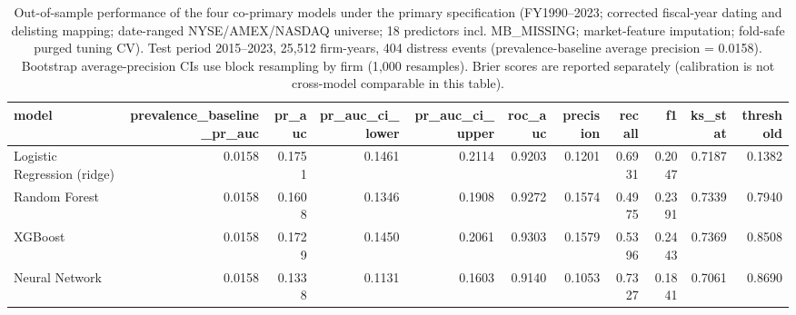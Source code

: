 \begin{table}[htbp]
\centering
\caption{Out-of-sample performance of the four co-primary models under the primary specification (FY1990--2023; corrected fiscal-year dating and delisting mapping; date-ranged NYSE/AMEX/NASDAQ universe; 18 predictors incl. MB\_MISSING; market-feature imputation; fold-safe purged tuning CV). Test period 2015--2023, 25,512 firm-years, 404 distress events (prevalence-baseline average precision = 0.0158). Bootstrap average-precision CIs use block resampling by firm (1{,}000 resamples). Brier scores are reported separately (calibration is not cross-model comparable in this table).}
\label{tab:model_performance_test_v2_4models}
\small
\begin{tabular}{lrrrrrrrrrr}
\toprule
model & prevalence\_baseline\_pr\_auc & pr\_auc & pr\_auc\_ci\_lower & pr\_auc\_ci\_upper & roc\_auc & precision & recall & f1 & ks\_stat & threshold \\
\midrule
Logistic Regression (ridge) & 0.0158 & 0.1751 & 0.1461 & 0.2114 & 0.9203 & 0.1201 & 0.6931 & 0.2047 & 0.7187 & 0.1382 \\
Random Forest & 0.0158 & 0.1608 & 0.1346 & 0.1908 & 0.9272 & 0.1574 & 0.4975 & 0.2391 & 0.7339 & 0.7940 \\
XGBoost & 0.0158 & 0.1729 & 0.1450 & 0.2061 & 0.9303 & 0.1579 & 0.5396 & 0.2443 & 0.7369 & 0.8508 \\
Neural Network & 0.0158 & 0.1338 & 0.1131 & 0.1603 & 0.9140 & 0.1053 & 0.7327 & 0.1841 & 0.7061 & 0.8690 \\
\bottomrule
\end{tabular}
\end{table}
